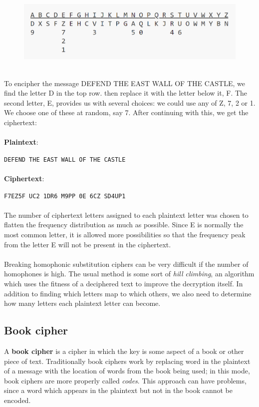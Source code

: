 \documentclass[Lau,binding=0.6cm,oneside]{sapthesis}
\begin{document}
\begin{figure}[H]
\includegraphics[scale=0.4]{homophonic_cipher}
\centering
\caption{}
\centering
\end{figure}
\ \\
To encipher the message \textsf{DEFEND THE EAST WALL OF THE CASTLE}, we find the letter \textsf{D} in the top row. then replace it with the letter below it, \textsf{F}. The second letter, \textsf{E}, provides us with several choices: we could use any of \textsf{Z}, \textsf{7}, \textsf{2} or \textsf{1}. We choose one of these at random, say \textsf{7}. After continuing with this, we get the ciphertext:\\
\ \\
\textbf{Plaintext}: \par\colorbox{gray!12}{\small{\texttt{DEFEND THE EAST WALL OF THE CASTLE}}}\\\\
\textbf{Ciphertext}: \par\colorbox{gray!12}{\small{\texttt{F7EZ5F UC2 1DR6 M9PP 0E 6CZ SD4UP1}}}\\
\ \\
The number of ciphertext letters assigned to each plaintext letter was chosen to flatten the frequency distribution as much as possible. Since \textsf{E} is normally the most common letter, it is allowed more possibilities so that the frequency peak from the letter \textsf{E} will not be present in the ciphertext.\\\\
Breaking homophonic substitution ciphers can be very difficult if the number of homophones is high. The usual method is some sort of \textit{hill climbing}, an algorithm which uses the fitness of a deciphered text to improve the decryption itself. In addition to finding which letters map to which others, we also need to determine how many letters each plaintext letter can become.

\subsection{Book cipher}
A \textbf{book cipher} is a cipher in which the key is some aspect of a book or other piece of text. Traditionally book ciphers work by replacing word in the plaintext of a message with the location of words from the book being used; in this mode, book ciphers are more properly called \textit{codes}. This approach can have problems, since a word which appears in the plaintext but not in the book cannot be encoded\supercite{book_cipher}.\\\\
\end{document}
